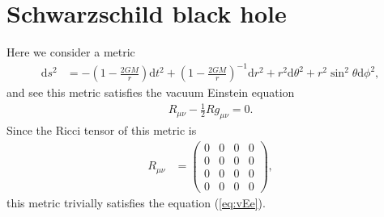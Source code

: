 \documentclass[10pt,onecolumn,dvipdfmx]{article}
\begin{document}
\title{}
\author{Kazuma Oka}
\date{}
\maketitle

\section{Schwarzschild black hole}
Here we consider a metric
\begin{align}
\mathrm{d} s^2 &=-\left( 1-\frac{2GM}{r} \right) \mathrm{d} t^2 +\left( 1-\frac{2GM}{r} \right) ^{-1} \mathrm{d} r^2 +r^2 \mathrm{d} \theta ^2 +r^2 \sin^2 {\theta } \mathrm{d} \phi ^2 , \label{eq:SchwarzschildMetcic}
\end{align}
and see this metric satisfies the vacuum Einstein equation
\begin{align}
R_{\mu \nu } -\frac{1}{2} Rg_{\mu \nu } =0.\label{eq:vEe}
\end{align}
Since the Ricci tensor of this metric is 
\begin{align}
R_{\mu \nu } &=
\left(
\begin{matrix}
0 & 0 & 0 & 0\\
0 & 0 & 0 & 0\\
0 & 0 & 0 & 0\\
0 & 0 & 0 & 0
\end{matrix}
\right),
\end{align}
this metric trivially satisfies the equation (\ref{eq:vEe}).
\end{document}
